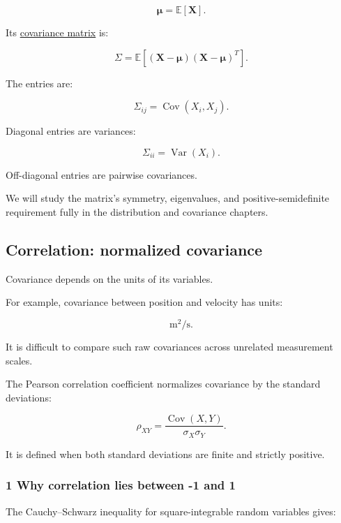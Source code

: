 \[
 \boldsymbol\mu=\mathbb E[\mathbf X].
\]

Its \hyperref[02-foundations-ii-ch023-expected-values-describe-centers-covariance-describes-dependence]{covariance matrix} is:

\[
 \boxed{ \Sigma= \mathbb E[ (\mathbf X-\boldsymbol\mu) (\mathbf X-\boldsymbol\mu)^T ] }.
\]

The entries are:

\[
 \Sigma_{ij}=\operatorname{Cov}(X_i,X_j).
\]

Diagonal entries are variances:

\[
 \Sigma_{ii}=\operatorname{Var}(X_i).
\]

Off-diagonal entries are pairwise covariances.

We will study the matrix's symmetry, eigenvalues, and positive-semidefinite requirement fully in the distribution and covariance chapters.

\subsection{Correlation: normalized covariance}\label{02-foundations-ii-ch023-correlation-normalized-covariance}

\hypertarget{02-foundations-ii-ch023-correlation-normalized-covariance}{}

Covariance depends on the units of its variables.

For example, covariance between position and velocity has units:

\[
 \mathrm{m^2/s}.
\]

It is difficult to compare such raw covariances across unrelated measurement scales.

The Pearson correlation coefficient normalizes covariance by the standard deviations:

\[
 \boxed{ \rho_{XY}= \frac{ \operatorname{Cov}(X,Y) }{ \sigma_X\sigma_Y } }.
\]

It is defined when both standard deviations are finite and strictly positive.

\subsubsection{1 Why correlation lies between -1 and 1}\label{02-foundations-ii-ch023-why-correlation-lies-between--1-and-1}

\hypertarget{02-foundations-ii-ch023-why-correlation-lies-between--1-and-1}{}

The Cauchy--Schwarz inequality for square-integrable random variables gives:

